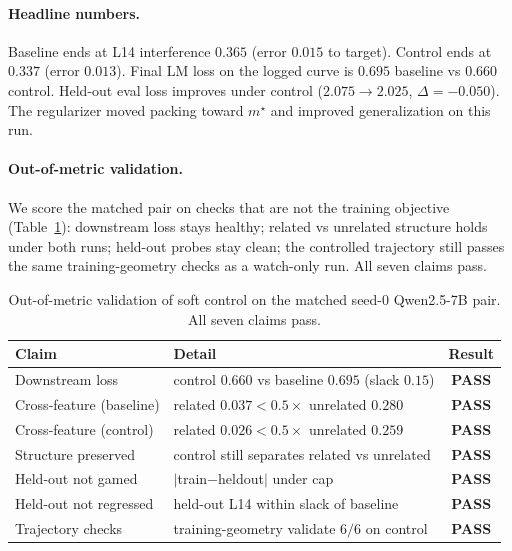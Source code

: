 \documentclass[11pt]{article}
\begin{document}
\paragraph{Headline numbers.}
Baseline ends at L14 interference $0.365$ (error $0.015$ to target). Control
ends at $0.337$ (error $0.013$). Final LM loss on the logged curve is $0.695$
baseline vs $0.660$ control. Held-out eval loss improves under control
($2.075{\to}2.025$, $\Delta{=}{-}0.050$). The regularizer moved packing toward
$m^\star$ and improved generalization on this run.

\paragraph{Out-of-metric validation.}
We score the matched pair on checks that are not the training objective
(Table~\ref{tab:validation}): downstream loss stays healthy; related vs
unrelated structure holds under both runs; held-out probes stay clean; the
controlled trajectory still passes the same training-geometry checks as a
watch-only run. All seven claims pass.

\begin{table}[H]
  \centering
  \caption{Out-of-metric validation of soft control on the matched seed-$0$
  Qwen2.5-7B pair. All seven claims pass.}
  \label{tab:validation}
  \setlength{\tabcolsep}{4pt}
  \begin{tabular}{@{}llc@{}}
    \toprule
    Claim & Detail & Result \\
    \midrule
    Downstream loss &
      control $0.660$ vs baseline $0.695$ (slack $0.15$) &
      \textbf{PASS} \\
    Cross-feature (baseline) &
      related $0.037 < 0.5\times$ unrelated $0.280$ &
      \textbf{PASS} \\
    Cross-feature (control) &
      related $0.026 < 0.5\times$ unrelated $0.259$ &
      \textbf{PASS} \\
    Structure preserved &
      control still separates related vs unrelated &
      \textbf{PASS} \\
    Held-out not gamed &
      $|$train$-$heldout$|$ under cap &
      \textbf{PASS} \\
    Held-out not regressed &
      held-out L14 within slack of baseline &
      \textbf{PASS} \\
    Trajectory checks &
      training-geometry validate $6/6$ on control &
      \textbf{PASS} \\
    \bottomrule
  \end{tabular}
\end{table}
\end{document}
